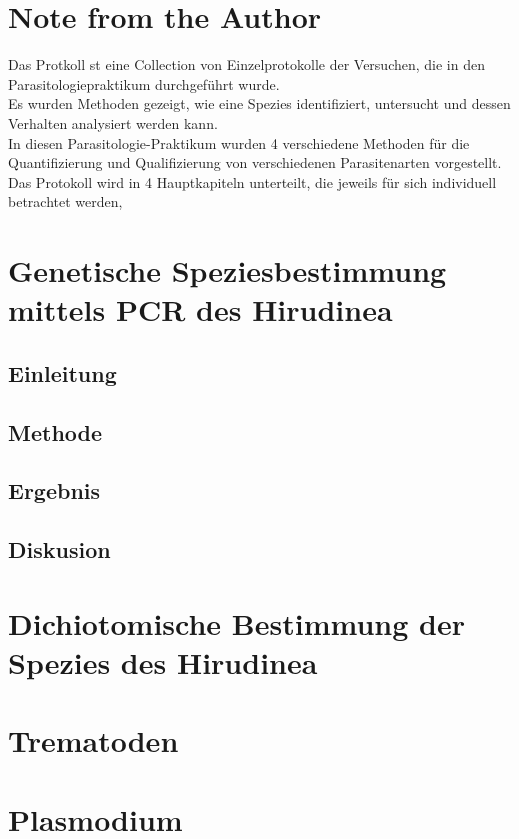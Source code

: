 \documentclass[oneside,10pt,a4paper]{report}
\begin{document}
	
	\tableofcontents
	\chapter{Note from the Author}
	Das Protkoll st eine Collection von Einzelprotokolle der Versuchen, die in den Parasitologiepraktikum durchgeführt wurde.\\
	Es wurden Methoden gezeigt, wie eine Spezies identifiziert, untersucht und dessen Verhalten analysiert werden kann.\\
	
	
	In diesen Parasitologie-Praktikum wurden 4 verschiedene Methoden für die Quantifizierung und Qualifizierung von verschiedenen Parasitenarten vorgestellt.\\
	Das Protokoll wird in 4 Hauptkapiteln unterteilt, die jeweils für sich individuell betrachtet werden,
	\chapter{Genetische Speziesbestimmung mittels PCR des Hirudinea}	
	\section{Einleitung}
	
	\section{Methode}
	\section{Ergebnis}
	\section{Diskusion}
	
	\chapter{Dichiotomische Bestimmung der Spezies des Hirudinea}
	
	\chapter{Trematoden}
	
	
	\chapter{Plasmodium}
	
	
	
\end{document}
